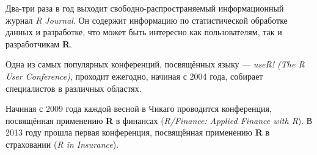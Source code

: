 Два-три раза в год выходит свободно-распространяемый информационный журнал \textit{R Journal}. Он содержит информацию по статистической обработке данных и разработке, что может быть интересно как пользователям, так и разработчикам \textbf{R}.

Одна из самых популярных конференций, посвящённых языку --- \textit{useR! (The R User Conference)}, проходит ежегодно, начиная с 2004 года, собирает специалистов в различных областях.

Начиная с 2009 года каждой весной в Чикаго проводится конференция, посвящённая применению \textbf{R} в финансах (\textit{R/Finance: Applied Finance with R}). В 2013 году прошла первая конференция, посвящённая применению \textbf{R} в страховании (\textit{R in Insurance}).

